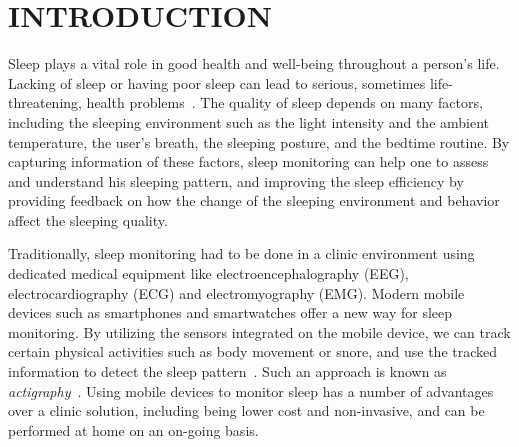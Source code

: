 \section{INTRODUCTION}\label{sec:1introduction}

Sleep plays a vital role in good health and well-being throughout a person's life. Lacking of sleep or having poor sleep can lead to
serious, sometimes life-threatening, health problems~\cite{lallukka2016contribution}. The quality of sleep depends on many factors,
including the sleeping environment such as the light intensity and the ambient temperature, the user's breath, the sleeping posture, and
the bedtime routine. By capturing information of these factors, sleep monitoring can help one to assess and understand his sleeping
pattern, and improving the sleep efficiency by providing feedback on how the change of the sleeping environment and behavior affect the
sleeping quality.

Traditionally, sleep monitoring had to be done in a clinic environment using dedicated medical equipment like electroencephalography (EEG), electrocardiography (ECG) and electromyography (EMG).  Modern mobile devices such as smartphones and smartwatches offer a new way for sleep monitoring. By utilizing the sensors integrated on the mobile device, we can track certain physical activities such as body movement or snore, and use the tracked information to detect the sleep pattern~\cite{zeo,Jawbone,SleepAndroid,fitbit,gu2016sleep}. Such an approach is known as \emph{actigraphy}~\cite{Actigraphy,ancoli2003role}. Using mobile devices to monitor sleep has a number of advantages over a clinic solution, including being lower cost and non-invasive, and can be performed at home on an on-going basis.



